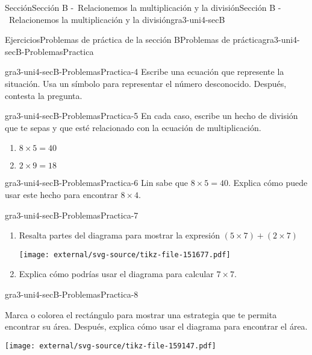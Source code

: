 \documentclass[twoside,14pt,]{extarticle}
\begin{document}
\begin{sectionptx}{Sección}{Sección B -~Relacionemos la multiplicación y la división}{}{Sección B -~Relacionemos la multiplicación y la división}{}{}{gra3-uni4-secB}
\begin{exercises-subsection}{Ejercicios}{Problemas de práctica de la sección B}{}{Problemas de práctica}{}{}{gra3-uni4-secB-ProblemasPractica}
\begin{divisionexercise}{2}{}{}{gra3-uni4-secB-ProblemasPractica-4}
Escribe una ecuación que represente la situación. Usa un símbolo para representar el número desconocido. Después, contesta la pregunta.%
\end{divisionexercise}%
\begin{divisionexercise}{3}{}{}{gra3-uni4-secB-ProblemasPractica-5}%
En cada caso, escribe un hecho de división que te sepas y que esté relacionado con la ecuación de multiplicación.%
%
\begin{enumerate}[label=(\alph*)]
\item{}\(\displaystyle 8 \times 5 = 40\)%
\item{}\(\displaystyle 2 \times 9 = 18\)%
\end{enumerate}
\end{divisionexercise}%
\begin{divisionexercise}{4}{}{}{gra3-uni4-secB-ProblemasPractica-6}%
Lin sabe que \(8 \times 5 = 40\). Explica cómo puede usar este hecho para encontrar \(8 \times 4\).%
\end{divisionexercise}%
\begin{divisionexercise}{5}{}{}{gra3-uni4-secB-ProblemasPractica-7}%
%
\begin{enumerate}[label=(\alph*)]
\item{}Resalta partes del diagrama para mostrar la expresión \((5 \times 7) + (2 \times 7)\)%
\begin{image}{0}{1}{0}{}%
\texttt{[image: external/svg-source/tikz-file-151677.pdf]}
\end{image}%
\item{}Explica cómo podrías usar el diagrama para calcular \(7\times 7\).%
\end{enumerate}
\end{divisionexercise}%
\begin{divisionexercise}{6}{}{}{gra3-uni4-secB-ProblemasPractica-8}%
\begin{sidebyside}{2}{0}{0}{0}%
\begin{sbspanel}{0.6}%
Marca o colorea el rectángulo para mostrar una estrategia que te permita encontrar su área. Después, explica cómo usar el diagrama para encontrar el área.%
\end{sbspanel}%
\begin{sbspanel}{0.4}%
\texttt{[image: external/svg-source/tikz-file-159147.pdf]}
\end{sbspanel}%
\end{sidebyside}%
\end{divisionexercise}%

\end{exercises-subsection}
\end{sectionptx}
\end{document}
